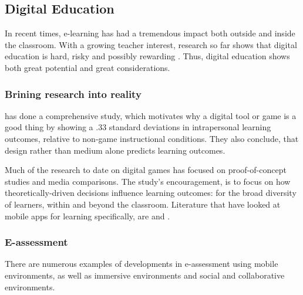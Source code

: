     

    \subsection{Digital Education}

    In recent times, e-learning has had a tremendous impact both outside and inside the classroom. With a growing teacher interest, research so far shows that digital education is hard, risky and possibly rewarding \citep{luckin}. Thus, digital education shows both great potential and great considerations.

    \subsubsection{Brining research into reality}

    \cite{gates} has done a comprehensive study, which motivates why a digital tool or game is a good thing by showing a .33 standard deviations in intrapersonal learning outcomes, relative to non-game instructional conditions. They also conclude, that design rather than medium alone predicts learning outcomes.

    Much of the research to date on digital games has focused on proof-of-concept studies and media comparisons. The study's encouragement, is to focus on how theoretically-driven decisions influence learning outcomes: for the broad diversity of learners, within and beyond the classroom. Literature that have looked at mobile apps for learning specifically, are \cite{godwin-jones} and \cite{page}.


    \subsubsection{E-assessment}
    There are numerous examples of developments in e-assessment using mobile environments, as well as immersive environments and social and collaborative environments.

